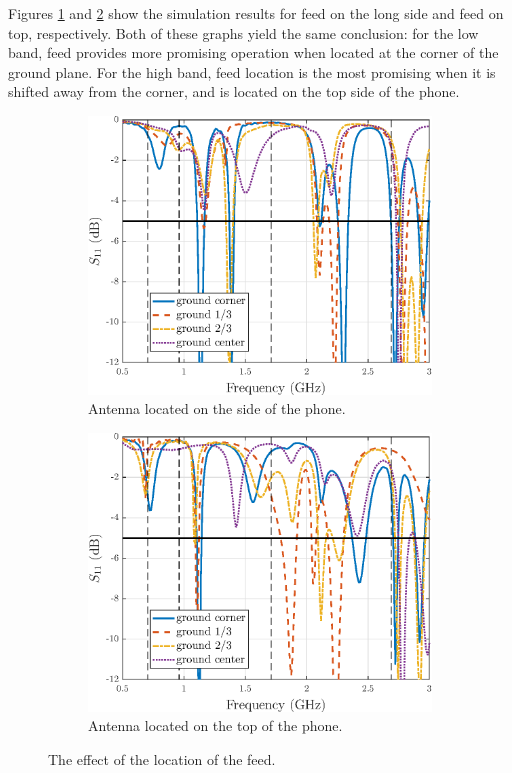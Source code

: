 Figures \ref{fig:feed_pos_side_res} and \ref{fig:feed_pos_top_res} show the simulation results for feed on the long side and feed on top, respectively. Both of these graphs yield the same conclusion: for the low band, feed provides more promising operation when located at the corner of the ground plane. For the high band, feed location is the most promising when it is shifted away from the corner, and is located on the top side of the phone.

\begin{figure}[H]
    \centering
    \begin{subfigure}[b]{0.49\textwidth}
        \includegraphics[width=\textwidth]{img/feed_pos_side_res.eps}
        \caption{Antenna located on the side of the phone.}
        \label{fig:feed_pos_side_res}
    \end{subfigure}
    \begin{subfigure}[b]{0.49\textwidth}
        \includegraphics[width=\textwidth]{img/feed_pos_top_res.eps}
        \caption{Antenna located on the top of the phone.}
        \label{fig:feed_pos_top_res}
    \end{subfigure}
    \caption{The effect of the location of the feed.}
    \label{fig:feed_effect}
\end{figure}


